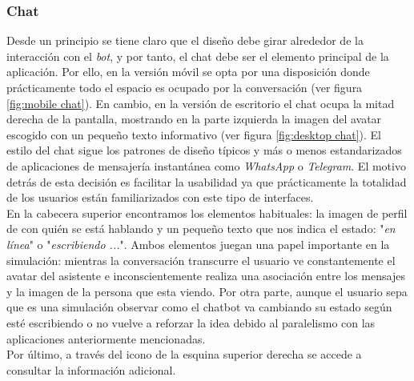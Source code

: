 \subsubsection{Chat}
Desde un principio se tiene claro que el diseño debe girar alrededor de la interacción con el \textit{bot}, y por tanto, el chat debe ser el elemento principal de la aplicación. Por ello, en la versión móvil se opta por una disposición donde prácticamente todo el espacio es ocupado por la conversación (ver figura \ref{fig:mobile chat}). En cambio, en la versión de escritorio el chat ocupa la mitad derecha de la pantalla, mostrando en la parte izquierda la imagen del avatar escogido con un pequeño texto informativo (ver figura \ref{fig:desktop chat}). El estilo del chat sigue los patrones de diseño típicos y más o menos estandarizados de aplicaciones de mensajería instantánea como \textit{WhatsApp} o \textit{Telegram}. El motivo detrás de esta decisión es facilitar la usabilidad ya que prácticamente la totalidad de los usuarios están familiarizados con este tipo de interfaces.\\

En la cabecera superior encontramos los elementos habituales: la imagen de perfil de con quién se está hablando y un pequeño texto que nos indica el estado: "\textit{en línea}" o "\textit{escribiendo ...}". Ambos elementos juegan una papel importante en la simulación: mientras la conversación transcurre el usuario ve constantemente el avatar del asistente e inconscientemente realiza una asociación entre los mensajes y la imagen de la persona que esta viendo. Por otra parte, aunque el usuario sepa que es una simulación observar como el chatbot va cambiando su estado según esté escribiendo o no vuelve a reforzar la idea debido al paralelismo con las aplicaciones anteriormente mencionadas.\\

Por último, a través del icono de la esquina superior derecha se accede a consultar la información adicional.\\

